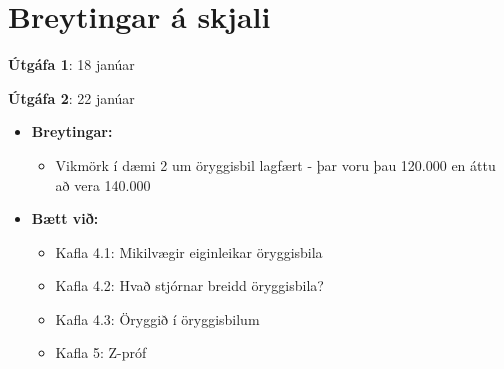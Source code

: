 \documentclass[
]{book}
\providecommand{\tightlist}{%
  \setlength{\itemsep}{0pt}\setlength{\parskip}{0pt}}
\begin{document}
\hypertarget{breytingar-uxe1-skjali}{%
\chapter{Breytingar á skjali}\label{breytingar-uxe1-skjali}}

\textbf{Útgáfa 1}: 18 janúar

\textbf{Útgáfa 2}: 22 janúar

\begin{itemize}
\item
  \textbf{Breytingar:}

  \begin{itemize}
  \tightlist
  \item
    Vikmörk í dæmi 2 um öryggisbil lagfært - þar voru þau 120.000 en áttu að vera 140.000
  \end{itemize}
\item
  \textbf{Bætt við:}

  \begin{itemize}
  \item
    Kafla 4.1: Mikilvægir eiginleikar öryggisbila
  \item
    Kafla 4.2: Hvað stjórnar breidd öryggisbila?
  \item
    Kafla 4.3: Öryggið í öryggisbilum
  \item
    Kafla 5: Z-próf
  \end{itemize}
\end{itemize}

  
\end{document}
